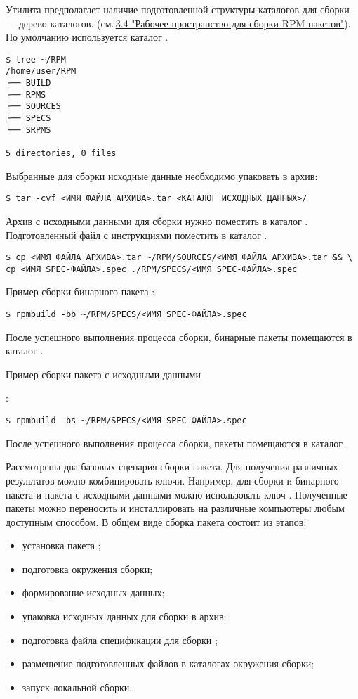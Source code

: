 Утилита предполагает наличие подготовленной структуры каталогов для сборки --- дерево каталогов.
(см.\,\hyperlink{3.4}{3.4 "Рабочее пространство для сборки RPM-пакетов"}). По умолчанию используется
каталог .

\begin{verbatim}
$ tree ~/RPM
/home/user/RPM
├── BUILD
├── RPMS
├── SOURCES
├── SPECS
└── SRPMS

5 directories, 0 files
\end{verbatim}

Выбранные для сборки исходные данные необходимо упаковать в  архив:

\begin{verbatim}
$ tar -cvf <ИМЯ ФАЙЛА АРХИВА>.tar <КАТАЛОГ ИСХОДНЫХ ДАННЫХ>/
\end{verbatim}

Архив с исходными данными для сборки нужно поместить в каталог .
Подготовленный  файл с инструкциями поместить в каталог .

\begin{verbatim}
$ cp <ИМЯ ФАЙЛА АРХИВА>.tar ~/RPM/SOURCES/<ИМЯ ФАЙЛА АРХИВА>.tar && \
cp <ИМЯ SPEC-ФАЙЛА>.spec ./RPM/SPECS/<ИМЯ SPEC-ФАЙЛА>.spec
\end{verbatim}

Пример сборки бинарного пакета :
\begin{verbatim}
$ rpmbuild -bb ~/RPM/SPECS/<ИМЯ SPEC-ФАЙЛА>.spec
\end{verbatim}
После успешного выполнения процесса сборки, бинарные пакеты  помещаются в каталог .

\hypertarget{rpmbuild-exampl-src}{Пример сборки пакета с исходными данными }:
\begin{verbatim}
$ rpmbuild -bs ~/RPM/SPECS/<ИМЯ SPEC-ФАЙЛА>.spec
\end{verbatim}
После успешного выполнения процесса сборки, пакеты  помещаются в каталог .

Рассмотрены два базовых сценария сборки пакета. Для получения различных результатов можно комбинировать ключи.
Например, для сборки и бинарного пакета и пакета с исходными данными можно использовать ключ \Sys{-ba}.
Полученные пакеты можно переносить и инсталлировать на различные компьютеры любым доступным способом.
В общем виде сборка пакета состоит из этапов:
\begin{itemize}
\item установка пакета ;
\item подготовка окружения сборки;
\item формирование исходных данных;
\item упаковка исходных данных для сборки в  архив;
\item подготовка файла спецификации для сборки ;
\item размещение подготовленных файлов в каталогах окружения сборки;
\item запуск локальной сборки.
\end{itemize}

